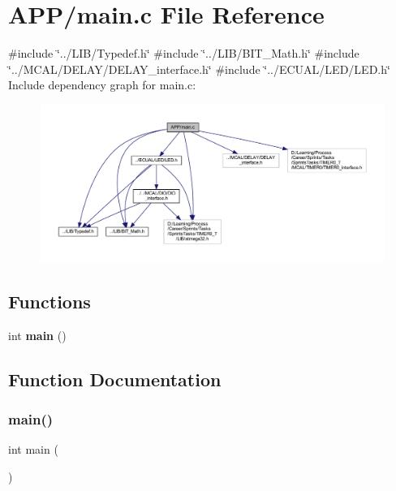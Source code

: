 \section{A\+P\+P/main.c File Reference}
\label{main_8c}
{\ttfamily \#include \char`\"{}../\+L\+I\+B/\+Typedef.\+h\char`\"{}}\newline
{\ttfamily \#include \char`\"{}../\+L\+I\+B/\+B\+I\+T\+\_\+\+Math.\+h\char`\"{}}\newline
{\ttfamily \#include \char`\"{}../\+M\+C\+A\+L/\+D\+E\+L\+A\+Y/\+D\+E\+L\+A\+Y\+\_\+interface.\+h\char`\"{}}\newline
{\ttfamily \#include \char`\"{}../\+E\+C\+U\+A\+L/\+L\+E\+D/\+L\+E\+D.\+h\char`\"{}}\newline
Include dependency graph for main.\+c\+:\nopagebreak
\begin{figure}[H]
\begin{center}
\leavevmode
\includegraphics[width=350pt]{main_8c__incl}
\end{center}
\end{figure}
\subsection*{Functions}
\begin{DoxyCompactItemize}
\item 
int \textbf{ main} ()
\end{DoxyCompactItemize}


\subsection{Function Documentation}
\mbox{\label{main_8c_ae66f6b31b5ad750f1fe042a706a4e3d4}} 
\subsubsection{main()}
{\footnotesize\ttfamily int main (\begin{DoxyParamCaption}{ }\end{DoxyParamCaption})}

